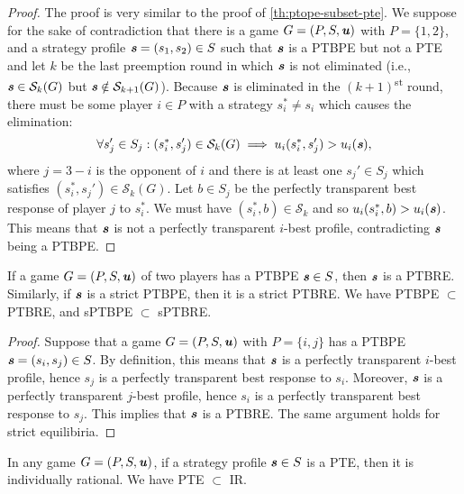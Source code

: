 \begin{proof}
	The proof is very similar to the proof of \autoref{th:ptope-subset-pte}.
	We suppose for the sake of contradiction that there is a game $G = (P, S, \boldsymbol{\mathit{u}})$ with $P = \{1, 2\}$, and a strategy profile $\boldsymbol{\mathit{s}} = (s_1, s_2) \in S$ such that $\boldsymbol{\mathit{s}}$ is a PTBPE but not a PTE and let $k$ be the last preemption round in which $\boldsymbol{\mathit{s}}$ is not eliminated (i.e., $\boldsymbol{\mathit{s}} \in \mathcal{S}_k(G)$ but $\boldsymbol{\mathit{s}} \notin \mathcal{S}_{k+1}(G)$).
	Because $\boldsymbol{\mathit{s}}$ is eliminated in the $(k+1)$\textsuperscript{st} round, there must be some player $i \in P$ with a strategy $s_i^* \ne s_i$ which causes the elimination:
	\[
		\forall s_j' \in S_j: (s_i^*, s_j') \in \mathcal{S}_k(G) \implies u_i(s_i^*, s_j') > u_i(\boldsymbol{\mathit{s}}),
	\]
	where $j = 3 - i$ is the opponent of $i$ and there is at least one $s_j' \in S_j$ which satisfies $(s_i^*, s_j') \in \mathcal{S}_k(G)$.
	Let $b \in S_j$ be the perfectly transparent best response of player $j$ to $s_i^*$.
	We must have $(s_i^*, b) \in \mathcal{S}_k$ and so $u_i(s_i^*, b) > u_i(\boldsymbol{\mathit{s}})$.
	This means that $\boldsymbol{\mathit{s}}$ is not a perfectly transparent $i$-best profile, contradicting $\boldsymbol{\mathit{s}}$ being a PTBPE.
\end{proof}

\begin{lemma}
	\label{th:ptbpe-subset-ptbre}
	If a game $G = (P, S, \boldsymbol{\mathit{u}})$ of two players has a PTBPE $\boldsymbol{\mathit{s}} \in S$, then $\boldsymbol{\mathit{s}}$ is a PTBRE.
	Similarly, if $\boldsymbol{\mathit{s}}$ is a strict PTBPE, then it is a strict PTBRE.
	We have PTBPE $\subset$ PTBRE, and sPTBPE $\subset$ sPTBRE.
\end{lemma}

\begin{proof}
	Suppose that a game $G = (P, S, \boldsymbol{\mathit{u}})$ with $P = \{i, j\}$ has a PTBPE $\boldsymbol{\mathit{s}} = (s_i, s_j) \in S$.
	By definition, this means that $\boldsymbol{\mathit{s}}$ is a perfectly transparent $i$-best profile, hence $s_j$ is a perfectly transparent best response to $s_i$.
	Moreover, $\boldsymbol{\mathit{s}}$ is a perfectly transparent $j$-best profile, hence $s_i$ is a perfectly transparent best response to $s_j$.
	This implies that $\boldsymbol{\mathit{s}}$ is a PTBRE.
	The same argument holds for strict equilibiria.
\end{proof}

\begin{observation}
	\label{th:pte-subset-ir}
	In any game $G = (P, S, \boldsymbol{\mathit{u}})$, if a strategy profile $\boldsymbol{\mathit{s}} \in S$ is a PTE, then it is individually rational.
	We have PTE $\subset$ IR.
\end{observation}

